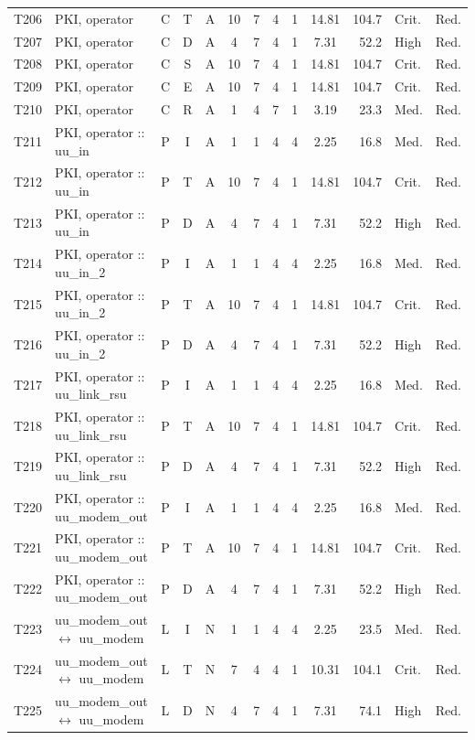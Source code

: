\documentclass[9pt]{extarticle}
\begin{document}
\begin{longtable}{l>{\raggedright\arraybackslash}p{6.3cm}ccccccccrll}
T206 & PKI, operator & C & T & A & 10 & 7 & 4 & 1 & 14.81 & 104.7 & Crit. & Red. \\
T207 & PKI, operator & C & D & A & 4 & 7 & 4 & 1 & 7.31 & 52.2 & High & Red. \\
T208 & PKI, operator & C & S & A & 10 & 7 & 4 & 1 & 14.81 & 104.7 & Crit. & Red. \\
T209 & PKI, operator & C & E & A & 10 & 7 & 4 & 1 & 14.81 & 104.7 & Crit. & Red. \\
T210 & PKI, operator & C & R & A & 1 & 4 & 7 & 1 & 3.19 & 23.3 & Med. & Red. \\
T211 & PKI, operator :: uu\_in & P & I & A & 1 & 1 & 4 & 4 & 2.25 & 16.8 & Med. & Red. \\
T212 & PKI, operator :: uu\_in & P & T & A & 10 & 7 & 4 & 1 & 14.81 & 104.7 & Crit. & Red. \\
T213 & PKI, operator :: uu\_in & P & D & A & 4 & 7 & 4 & 1 & 7.31 & 52.2 & High & Red. \\
T214 & PKI, operator :: uu\_in\_2 & P & I & A & 1 & 1 & 4 & 4 & 2.25 & 16.8 & Med. & Red. \\
T215 & PKI, operator :: uu\_in\_2 & P & T & A & 10 & 7 & 4 & 1 & 14.81 & 104.7 & Crit. & Red. \\
T216 & PKI, operator :: uu\_in\_2 & P & D & A & 4 & 7 & 4 & 1 & 7.31 & 52.2 & High & Red. \\
T217 & PKI, operator :: uu\_link\_rsu & P & I & A & 1 & 1 & 4 & 4 & 2.25 & 16.8 & Med. & Red. \\
T218 & PKI, operator :: uu\_link\_rsu & P & T & A & 10 & 7 & 4 & 1 & 14.81 & 104.7 & Crit. & Red. \\
T219 & PKI, operator :: uu\_link\_rsu & P & D & A & 4 & 7 & 4 & 1 & 7.31 & 52.2 & High & Red. \\
T220 & PKI, operator :: uu\_modem\_out & P & I & A & 1 & 1 & 4 & 4 & 2.25 & 16.8 & Med. & Red. \\
T221 & PKI, operator :: uu\_modem\_out & P & T & A & 10 & 7 & 4 & 1 & 14.81 & 104.7 & Crit. & Red. \\
T222 & PKI, operator :: uu\_modem\_out & P & D & A & 4 & 7 & 4 & 1 & 7.31 & 52.2 & High & Red. \\
T223 & uu\_modem\_out $\leftrightarrow$ uu\_modem & L & I & N & 1 & 1 & 4 & 4 & 2.25 & 23.5 & Med. & Red. \\
T224 & uu\_modem\_out $\leftrightarrow$ uu\_modem & L & T & N & 7 & 4 & 4 & 1 & 10.31 & 104.1 & Crit. & Red. \\
T225 & uu\_modem\_out $\leftrightarrow$ uu\_modem & L & D & N & 4 & 7 & 4 & 1 & 7.31 & 74.1 & High & Red. \\
\end{longtable}
\end{document}
